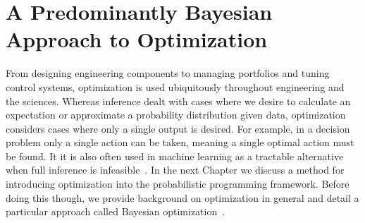 
\chapter{A Predominantly Bayesian Approach to Optimization}
\label{chp:opt}

From designing engineering components to managing portfolios and tuning control systems,
optimization is used ubiquitously throughout engineering and the sciences.   Whereas inference
dealt with cases where we desire to calculate an expectation or approximate a probability distribution
given data, optimization considers cases where only a single output is desired.  For example, in
a decision problem only a single action can be taken, meaning a single optimal action must be
found.  It it is also often used in machine learning as a tractable alternative when full inference
is infeasible~\citep{murphy2012machine}.  In the next Chapter we discuss a method for introducing
optimization into the probabilistic programming framework.  Before doing this though, we provide
background on optimization in general and detail a particular approach called Bayesian
optimization~\cite{jones1998efficient,shahriari2016taking}.






